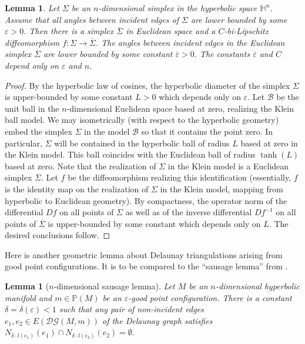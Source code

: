 \documentclass{amsart}
\newcommand{\HH}{\mathbb{H}}
\newcommand{\Points}{\mathbb{P}}
\newcommand{\DelanGraph}{\mathcal{DG}}
\theoremstyle{plain}
\newtheorem{lemma}[theorem]{Lemma}
\numberwithin{equation}{section}
\theoremstyle{definition}
\begin{document}
\begin{lemma}
\label{lemma:transforming a hyperbolic simplex to a Euclidean simplex}
Let $\Sigma$ be an $n$-dimensional simplex in the hyperbolic space $\HH^n$.
Assume that all angles between incident edges of $\Sigma$ are lower bounded by some $\varepsilon > 0$. Then there is a  simplex $\overline{\Sigma}$ in Euclidean space and a $C$-bi-Lipschitz diffeomorphism  $f : \Sigma \to \overline{\Sigma} $. The angles between incident edges in the Euclidean simplex $\overline{\Sigma}$ are lower bounded by some constant $\overline{\varepsilon} > 0$. The constants $\overline{\varepsilon}$ and $C$   depend only on $\varepsilon$ and $n$.
\end{lemma}
\begin{proof}
By the hyperbolic law of cosines, the hyperbolic diameter of the simplex $\Sigma$ is upper-bounded by some constant $L >0$ which depends only on $\varepsilon$. Let $\mathcal{B}$ be the unit ball in the $n$-dimensional Euclidean space based at zero,  realizing the Klein ball model. We may isometrically (with respect to the hyperbolic geometry) embed the simplex $\Sigma$ in the model $\mathcal B$ so that it contains the point zero. In particular, $\Sigma$ will be contained in the hyperbolic ball of radius $L$ based at zero in the Klein model. This ball coincides with the Euclidean ball of radius $\tanh (L)$ based at zero. Note that the realization of $\Sigma$ in the Klein model is a Euclidean simplex $\overline \Sigma$. Let $f$ be the diffeomorphism realizing this identification (essentially, $f$ is the identity map on the realization of $\Sigma$ in the Klein model, mapping from hyperbolic to Euclidean geometry). By compactness, the operator norm of the differential $Df$ on all points of $\Sigma$ as well as of the inverse differential $Df^{-1}$ on all points of $\overline \Sigma$ is upper-bounded by some constant which depends only on $L$. The desired conclusions follow.
\end{proof}

Here is another geometric lemma about Delaunay triangulations arising from good point configurations. It is to be compared to the \enquote{sausage lemma} from \cite[Lemma 2.3]{gurel2017recurrence}.

\begin{lemma}[$n$-dimensional sausage lemma]
\label{lemma:sausage}
Let $M$ be an $n$-dimensional hyperbolic manifold and $m \in \Points(M)$ be an $\varepsilon$-good point configuration.
There is a constant $\delta= \delta(\varepsilon) < 1$ such that
any  pair of \emph{non-incident} edges $e_1,e_2 \in E(\DelanGraph(M,m))$ of 
the Delaunay graph satisfies $N_{\delta\cdot l(e_1)}(e_1) \cap N_{\delta\cdot l(e_2)}(e_2) = \emptyset$.
\end{lemma}
\end{document}
